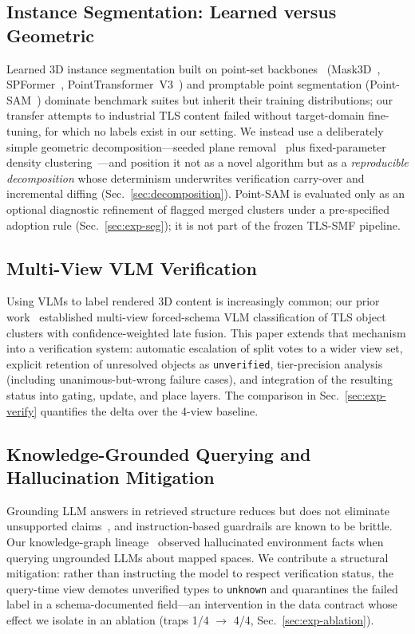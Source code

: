 \subsection{Instance Segmentation: Learned versus Geometric}
Learned 3D instance segmentation built on point-set
backbones~\cite{qi2017pointnetpp}
(Mask3D~\cite{schult2023mask3d}, SPFormer~\cite{sun2023spformer},
PointTransformer~V3~\cite{wu2024ptv3}) and promptable point
segmentation (Point-SAM~\cite{zhou2024pointsam}) dominate benchmark suites
but inherit their training distributions; our transfer attempts to
industrial TLS content failed without target-domain fine-tuning, for which
no labels exist in our setting. We instead use a deliberately simple
geometric decomposition---seeded plane
removal~\cite{fischler1981ransac,schnabel2007efficient} plus
fixed-parameter density clustering~\cite{ester1996dbscan}---and position
it not as a novel algorithm but as a
\emph{reproducible decomposition} whose determinism underwrites
verification carry-over and incremental diffing
(Sec.~\ref{sec:decomposition}). Point-SAM is evaluated only as an optional
diagnostic refinement of flagged merged clusters under a pre-specified
adoption rule (Sec.~\ref{sec:exp-seg}); it is not part of the frozen
TLS-SMF pipeline.

\subsection{Multi-View VLM Verification}
Using VLMs to label rendered 3D content is increasingly common; our prior
work~\cite{kim2026ictc} established multi-view forced-schema VLM
classification of TLS object clusters with confidence-weighted late fusion.
This paper extends that mechanism into a verification system: automatic
escalation of split votes to a wider view set, explicit retention of
unresolved objects as \texttt{unverified}, tier-precision analysis
(including unanimous-but-wrong failure cases), and integration of the
resulting status into gating, update, and place layers. The comparison in
Sec.~\ref{sec:exp-verify} quantifies the delta over the 4-view baseline.

\subsection{Knowledge-Grounded Querying and Hallucination Mitigation}
Grounding LLM answers in retrieved structure reduces but does not eliminate
unsupported claims~\cite{lewis2020rag,ji2023hallucination}, and
instruction-based guardrails are known to be brittle. Our knowledge-graph lineage~\cite{kim2025isis} observed
hallucinated environment facts when querying ungrounded LLMs about mapped
spaces. We contribute a structural mitigation: rather than instructing the
model to respect verification status, the query-time view demotes unverified
types to \texttt{unknown} and quarantines the failed label in a
schema-documented field---an intervention in the data contract whose effect
we isolate in an ablation (traps 1/4 $\rightarrow$ 4/4,
Sec.~\ref{sec:exp-ablation}).

